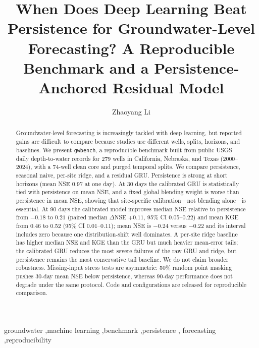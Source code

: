 \documentclass[preprint,12pt]{elsarticle}
\begin{document}
\begin{frontmatter}

\title{When Does Deep Learning Beat Persistence for Groundwater-Level Forecasting? A Reproducible Benchmark and a Persistence-Anchored Residual Model}

\author{Zhaoyang Li}


\begin{abstract}
Groundwater-level forecasting is increasingly tackled with deep learning, but
reported gains are difficult to compare because studies use different wells,
splits, horizons, and baselines. We present \texttt{gwbench}, a reproducible
benchmark built from public USGS daily depth-to-water records for 279 wells in
California, Nebraska, and Texas (2000--2024), with a 74-well clean core and
purged temporal splits. We compare persistence, seasonal naive, per-site
ridge, and a residual GRU. Persistence is strong at short
horizons (mean NSE 0.97 at one day). At 30 days the calibrated GRU is
statistically tied with persistence on mean NSE, and a fixed global blending
weight is worse than persistence in mean NSE, showing that site-specific
calibration---not blending alone---is essential. At 90 days the calibrated
model improves median NSE relative to persistence from $-0.18$ to $0.21$
(paired median $\Delta$NSE $+0.11$, 95\% CI 0.05--0.22) and mean KGE from 0.46
to 0.52 (95\% CI 0.01--0.11); mean NSE is $-0.24$ versus $-0.22$ and its
interval includes zero because one distribution-shift well dominates. A
per-site ridge baseline has higher median NSE and KGE than the GRU but much
heavier mean-error tails; the calibrated GRU reduces the most severe failures
of the raw GRU and ridge, but persistence remains the most conservative tail
baseline. We do not claim broader robustness. Missing-input stress tests are
asymmetric: 50\% random point masking pushes 30-day mean NSE below
persistence, whereas 90-day performance does not degrade under the same
protocol. Code and configurations are released for reproducible
comparison.
\end{abstract}

\begin{keyword}
groundwater \sep machine learning \sep benchmark \sep persistence \sep
forecasting \sep reproducibility
\end{keyword}

\end{frontmatter}
\end{document}
